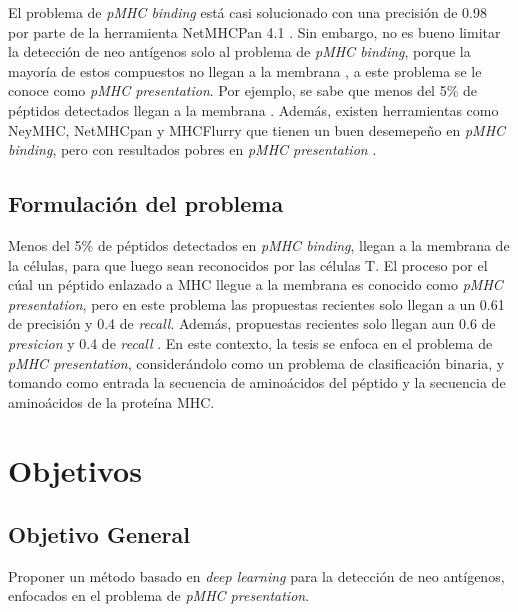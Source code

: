 El problema de \textit{pMHC binding} está casi solucionado con una precisión de 0.98 por parte de la herramienta NetMHCPan 4.1 \citep{reynisson2020netmhcpan}. Sin embargo, no es bueno limitar la detección de neo antígenos solo al problema de \textit{pMHC binding}, porque la mayoría de estos compuestos no llegan a la membrana \citep{mill2022neoms}, a este problema se le conoce como \textit{pMHC presentation}. Por ejemplo, se sabe que menos del 5\% de péptidos detectados llegan a la membrana \citep{de2020neoantigen, mill2022neoms, bulik2019deep, bassani2015mass, yadav2014predicting}. Además, existen herramientas como NeyMHC, NetMHCpan y MHCFlurry que tienen un buen desemepeño en \textit{pMHC binding}, pero con resultados pobres en  \textit{pMHC presentation} \citep{bulik2019deep}. 


\subsection{Formulación del problema}

Menos del 5\% de péptidos detectados en \textit{pMHC binding}, llegan a la membrana de la células, para que luego sean reconocidos por las células T.  El proceso por el cúal un péptido enlazado a MHC llegue a la membrana es conocido como  \textit{pMHC presentation}, pero en este problema las propuestas recientes solo llegan a un 0.61 de precisión y 0.4 de \textit{recall}. Además, propuestas recientes solo llegan aun 0.6 de \textit{presicion} y 0.4 de \textit{recall} \citep{mill2022neoms}. En este contexto, la tesis se enfoca en el problema de \textit{pMHC presentation}, considerándolo como un problema de clasificación binaria, y tomando como entrada la secuencia de aminoácidos del péptido y la secuencia de aminoácidos de la proteína MHC. 



\section{Objetivos}
\label{sec:objetivos}

\subsection{Objetivo General}

Proponer un método basado en \textit{deep learning} para la detección de neo antígenos, enfocados en el problema de \textit{pMHC presentation}. 

